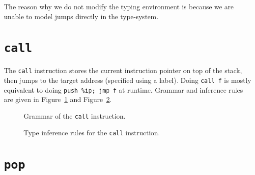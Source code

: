 The reason why we do not modify the typing environment is because we are unable to model jumps directly in the type-system.

\section{\texttt{call}}\label{sec:nstar-instructionset-call}

The \texttt{call} instruction stores the current instruction pointer on top of the stack, then jumps to the target address (specified using a label).
Doing \texttt{call f} is mostly equivalent to doing \texttt{push \%ip; jmp f} at runtime.
Grammar and inference rules are given in Figure~\ref{fig:nstar-instructionset-call-grammar} and Figure~\ref{fig:nstar-instructionset-call-typerules}.

\begin{figure}[H]
  \centering


  \caption{Grammar of the \texttt{call} instruction.}
  \label{fig:nstar-instructionset-call-grammar}
\end{figure}

\begin{figure}[H]
  \centering

  \begin{prooftree}
  \end{prooftree}

  \caption{Type inference rules for the \texttt{call} instruction.}
  \label{fig:nstar-instructionset-call-typerules}
\end{figure}

\section{\texttt{pop}}\label{sec:nstar-instructionset-pop}

